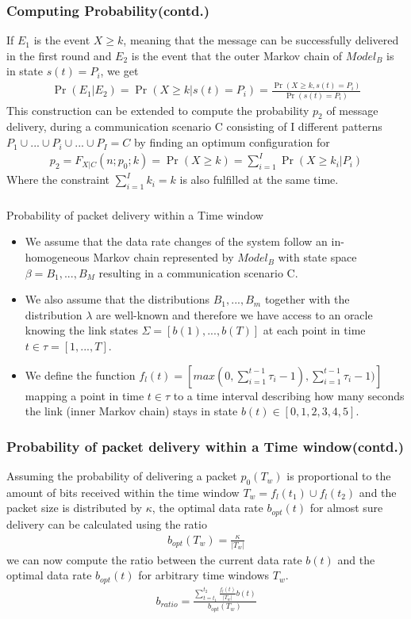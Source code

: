 \documentclass{beamer}
\providecommand{\abs}[1]{\vert#1\vert}
\providecommand{\pr}[1]{\ensuremath{\Pr\left(#1\right)}}
\begin{document}
\begin{frame}[fragile]
\frametitle{Computing Probability(contd.)}
   If $E_1$ is the event $X \geq k$, meaning that the message can be successfully delivered in the first round and $E_2$ is the event that the outer Markov chain of $Model_B$ is in state $s(t) = P_i$, we get
   \begin{align} 
      \pr{E_1|E_2} = \pr{X \geq k | s(t) = P_i} = \frac{\pr{X \geq k,s(t) = P_i}}{\pr{s(t) = P_i}} \label{Eq:3}
   \end{align}
   This construction can be extended to compute the probability $p_2$ of message delivery, during a communication scenario C consisting of I different patterns $P_1 \cup ... \cup P_i \cup ... \cup P_I = C$ by finding an optimum configuration for
   \begin{align}
       p_2 = F_{X|C}(n;p_0;k) = \pr{X \geq k} = \sum_{i=1}^{I} \pr{X \geq k_i| P_i}  \label{Eq:4}
   \end{align}
   Where the constraint $\sum_{i=1}^{I} k_i = k $ is also fulfilled at the same time.
\end{frame}
\begin{frame}[fragile]
\frametitle{}
\begin{block}{Probability of packet delivery within a Time window}
\begin{itemize}
    \item We assume that the data rate changes of the system follow an in-homogeneous Markov chain represented by $Model_B$ with state space $\beta = B_1, . . . , B_M$ resulting in a communication scenario C.
    \item We also assume that the distributions $B_1, . . . , B_m$ together with the distribution $\lambda$ are well-known and therefore we have access to an oracle knowing the link states $\Sigma = [b(1), . . . , b(T)]$ at each point in time $t \in \tau = [1, . . . , T]$.
    \item We define the function $f_l(t) = [max(0, \sum_{i=1}^{t-1} \tau_i - 1), \sum_{i=1}^{t-1} \tau_i - 1)]$ mapping a point in time $t \in \tau$ to a time interval describing how many seconds the link (inner Markov chain) stays in state $b(t) \in [0,1,2,3,4,5]$.
\end{itemize}
\end{block}
\end{frame}
\begin{frame}[fragile]
\frametitle{Probability of packet delivery within a Time window(contd.)}
Assuming the probability of delivering a packet $p_0(T_w)$ is proportional to the amount of bits received within the time window $T_{w} = f_{l}(t_1) \cup f_{l}(t_2)$ and the packet size is distributed by $\kappa$, the optimal data rate $b_{opt}(t)$ for almost sure delivery can be calculated using the ratio
\begin{align}
b_{opt}(T_w) = \frac{\kappa}{\abs{T_w}} \label{Eq:5}
\end{align}
we can now compute the ratio between the current data rate $b(t)$ and the optimal data rate $b_{opt}(t)$ for arbitrary time windows $T_w$.
\begin{align}
b_{ratio} = \frac{\sum_{t=t_1}^{t_2} \frac{f_l(t)}{\abs{T_w}}b(t)}{b_{opt}(T_w)} \label{Eq:6}
\end{align}
\end{frame}
\end{document}
